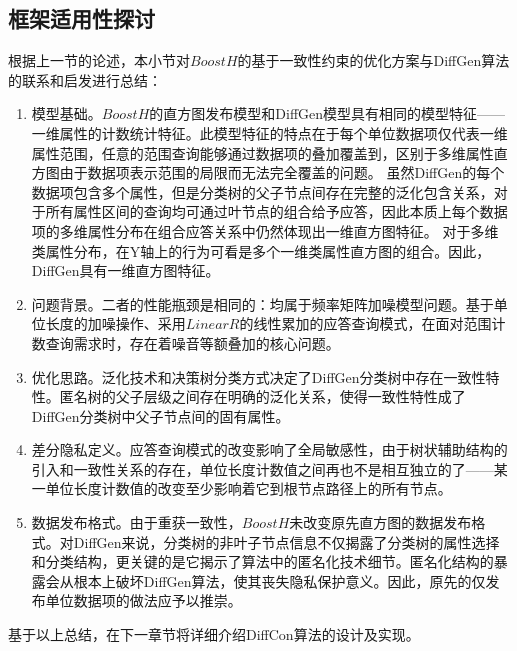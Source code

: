 


\subsection{框架适用性探讨}

根据上一节的论述，本小节对$BoostH$的基于一致性约束的优化方案与DiffGen算法的联系和启发进行总结：
\begin{enumerate}
	\item 模型基础。$BoostH$的直方图发布模型和DiffGen模型具有相同的模型特征——一维属性的计数统计特征。此模型特征的特点在于每个单位数据项仅代表一维属性范围，任意的范围查询能够通过数据项的叠加覆盖到，区别于多维属性直方图由于数据项表示范围的局限而无法完全覆盖的问题。
	虽然DiffGen的每个数据项包含多个属性，但是分类树的父子节点间存在完整的泛化包含关系，对于所有属性区间的查询均可通过叶节点的组合给予应答，因此本质上每个数据项的多维属性分布在组合应答关系中仍然体现出一维直方图特征。
	对于多维类属性分布，在Y轴上的行为可看是多个一维类属性直方图的组合。因此，DiffGen具有一维直方图特征。
	\item 问题背景。二者的性能瓶颈是相同的：均属于频率矩阵加噪模型问题。基于单位长度的加噪操作、采用$LinearR$的线性累加的应答查询模式，在面对范围计数查询需求时，存在着噪音等额叠加的核心问题。
	\item 优化思路。泛化技术和决策树分类方式决定了DiffGen分类树中存在一致性特性。匿名树的父子层级之间存在明确的泛化关系，使得一致性特性成了DiffGen分类树中父子节点间的固有属性。
	\item 差分隐私定义。应答查询模式的改变影响了全局敏感性，由于树状辅助结构的引入和一致性关系的存在，单位长度计数值之间再也不是相互独立的了——某一单位长度计数值的改变至少影响着它到根节点路径上的所有节点。
	\item 数据发布格式。由于重获一致性，$BoostH$未改变原先直方图的数据发布格式。对DiffGen来说，分类树的非叶子节点信息不仅揭露了分类树的属性选择和分类结构，更关键的是它揭示了算法中的匿名化技术细节。匿名化结构的暴露会从根本上破坏DiffGen算法，使其丧失隐私保护意义。因此，原先的仅发布单位数据项的做法应予以推崇。
	
\end{enumerate}

基于以上总结，在下一章节将详细介绍DiffCon算法的设计及实现。